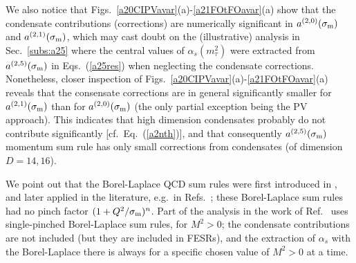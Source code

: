 \documentclass[aps,nofootinbib,showkeys,noshowpacs,preprintnumbers,amsmath,amssymb]{revtex4}
\newcommand{\sm}{{\sigma_{\rm m}}}
\begin{document}
We also notice that Figs.~\ref{a20CIPVavar}(a)-\ref{a21FOtFOavar}(a) show that the condensate contributions (corrections) are numerically significant in $a^{(2,0)}(\sm)$ and $a^{(2,1)}(\sm)$, which may cast doubt on the (illustrative) analysis in Sec.~\ref{subs:a25} where the central values of $\alpha_s(m^2_{\tau})$ were extracted from $a^{(2,5)}(\sm)$ in Eqs.~(\ref{a25res}) when neglecting the condensate corrections. Nonetheless, closer inspection of Figs.~\ref{a20CIPVavar}(a)-\ref{a21FOtFOavar}(a) reveals that the consensate corrections are in general significantly smaller for $a^{(2,1)}(\sm)$ than for $a^{(2,0)}(\sm)$ (the only partial exception being the PV approach). This indicates that high dimension condensates probably do not contribute significantly [cf.~Eq.~(\ref{a2nth})], and that consequently $a^{(2,5)}(\sm)$ momentum sum rule has only small corrections from condensates (of dimension $D=14, 16$).
  
We point out that the Borel-Laplace QCD sum rules were first introduced in \cite{SVZ}, and later applied in the literature, e.g.~in Refs.~\cite{IoffeBL,3dAQCD}; these Borel-Laplace sum rules had no pinch factor $(1+Q^2/\sm)^n$. Part of the analysis in the work of Ref.~\cite{Pich} uses single-pinched Borel-Laplace sum rules, for $M^2 >0$; the condensate contributions are not included (but they are included in FESRs), and the extraction of $\alpha_s$ with the Borel-Laplace there is always for a specific chosen value of $M^2>0$ at a time.
\end{document}
